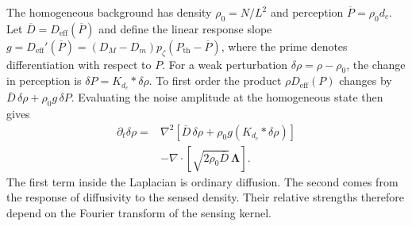 \documentclass[aps,prl,reprint,letterpaper]{revtex4-2}
\begin{document}
The homogeneous background has density \(\rho_0=N/L^2\) and perception \(\overline P=\rho_0 d_c\). Let \(\overline D=D_{\mathrm{eff}}(\overline P)\) and define the linear response slope \(g=D_{\mathrm{eff}}'(\overline P) = (D_M-D_m)p_\zeta(P_{\mathrm{th}}-\overline P)\), where the prime denotes differentiation with respect to \(P\). For a weak perturbation \(\delta\rho=\rho-\rho_0\), the change in perception is \(\delta P=K_{d_c}*\delta\rho\). To first order the product \(\rho D_{\mathrm{eff}}(P)\) changes by \(\overline D\,\delta\rho+\rho_0 g\,\delta P\). Evaluating the noise amplitude at the homogeneous state then gives
\begin{equation}
    \begin{aligned}
    \partial_t\delta\rho={}&
    \nabla^2[\overline D\,\delta\rho+\rho_0 g(K_{d_c}*\delta\rho)]\\
    &-\nabla\cdot\!\left[\sqrt{2\rho_0\overline D}\,\boldsymbol\Lambda\right].
    \end{aligned}
    \label{eq:qs-linear}
\end{equation}
The first term inside the Laplacian is ordinary diffusion. The second comes from the response of diffusivity to the sensed density. Their relative strengths therefore depend on the Fourier transform of the sensing kernel.
\end{document}
